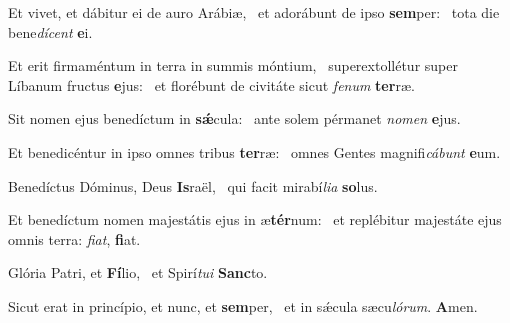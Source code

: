 \item Et vivet, et dábitur ei de auro Arábiæ,~\pscross{} et adorábunt de ipso \textbf{sem}per:~\psstar{} tota die bene\textit{dícent} \textbf{e}i.

\item Et erit firmaméntum in terra in summis móntium,~\pscross{} superextollétur super Líbanum fructus \textbf{e}jus:~\psstar{} et florébunt de civitáte sicut \textit{fenum} \textbf{ter}ræ.

\item Sit nomen ejus benedíctum in \textbf{sǽ}cula:~\psstar{} ante solem pérmanet \textit{nomen} \textbf{e}jus.

\item Et benedicéntur in ipso omnes tribus \textbf{ter}ræ:~\psstar{} omnes Gentes magnifi\textit{cábunt} \textbf{e}um.

\item Benedíctus Dóminus, Deus \textbf{Is}raël,~\psstar{} qui facit mirabí\textit{lia} \textbf{so}lus.

\item Et benedíctum nomen majestátis ejus in æ\textbf{tér}num:~\psstar{} et replébitur majestáte ejus omnis terra: \textit{fiat}, \textbf{fi}at.

\item Glória Patri, et \textbf{Fí}lio,~\psstar{} et Spirí\textit{tui} \textbf{Sanc}to.

\item Sicut erat in princípio, et nunc, et \textbf{sem}per,~\psstar{} et in sǽcula sæcu\textit{lórum}. \textbf{A}men.
